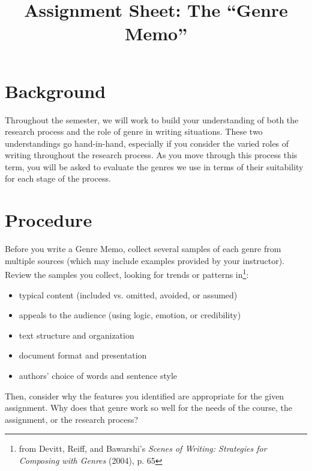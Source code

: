 \documentclass[10pt, oneside, twocolumn]{amsart}	%
\title[The ``Genre Memo'']{Assignment Sheet: The ``Genre Memo''}
\begin{document}
%
\thispagestyle{empty}



\section{Background} %
\label{sec:background}
Throughout the semester, we will work to build your understanding of both the research process and the role of genre in writing situations. These two understandings go hand-in-hand, especially if you consider the varied roles of writing throughout the research process. As you move through this process this term, you will be asked to evaluate the genres we use in terms of their suitability for each stage of the process.

\section{Procedure} %
\label{sec:procedure}
Before you write a Genre Memo, collect several samples of each genre from multiple sources (which may include examples provided by your instructor). Review the samples you collect, looking for trends or patterns in\footnote{from Devitt, Reiff, and Bawarshi's \emph{Scenes of Writing: Strategies for Composing with Genres} (2004), p. 65}:
\begin{itemize}
	\item typical content (included vs. omitted, avoided, or assumed)
	\item appeals to the audience (using logic, emotion, or credibility)
	\item text structure and organization
	\item document format and presentation
	\item authors' choice of words and sentence style
\end{itemize}

Then, consider why the features you identified are appropriate for the given assignment. Why does that genre work so well for the needs of the course, the assignment, or the research process?
\end{document}
